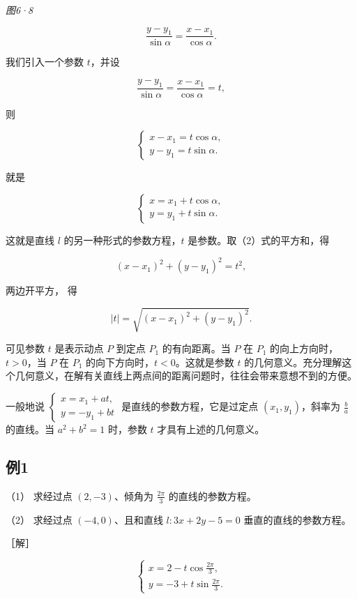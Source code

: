 \emph{图6·8}

\[
\frac {y - y_{1}}{\sin \alpha} = \frac {x - x_{1}}{\cos \alpha}.
\]

我们引入一个参数 \(t\)，并设

\[
\frac {y - y_{1}}{\sin \alpha} = \frac {x - x_{1}}{\cos \alpha} = t,
\]

则

\[
\left\{ \begin{array}{l} x - x_{1} = t \cos \alpha, \\ y - y_{1} = t \sin \alpha. \end{array} \right. \tag {2}
\]

就是

\[
\left\{ \begin{array}{l} x = x_{1} + t \cos \alpha, \\ y = y_{1} + t \sin \alpha. \end{array} \right.
\]

这就是直线 \(l\) 的另一种形式的参数方程，\(t\)
是参数。取（2）式的平方和，得

\[
(x - x_{1}) ^ {2} + (y - y_{1}) ^ {2} = t^{2},
\]

两边开平方， 得

\[
| t | = \sqrt {(x - x_{1}) ^ {2} + (y - y_{1}) ^ {2}}.
\]

可见参数 \(t\) 是表示动点 \(P\) 到定点 \(P_{1}\) 的有向距离。当 \(P\) 在
\(P_{1}\) 的向上方向时，\(t > 0\)，当 \(P\) 在 \(P_{1}\)
的向下方向时，\(t < 0\)。这就是参数 \(t\)
的几何意义。充分理解这个几何意义，在解有关直线上两点间的距离问题时，往往会带来意想不到的方便。

一般地说
\(\left\{ \begin{array}{l} x = x_{1} + at, \\ y = -y_{1} + bt \end{array} \right.\)
是直线的参数方程，它是过定点 \((x_{1}, y_{1})\)，斜率为 \(\frac{b}{a}\)
的直线。当 \(a^{2} + b^{2} = 1\) 时，参数 \(t\) 才具有上述的几何意义。

\subsection{例1}\label{ux4f8b1-44}

（1） 求经过点 \((2,-3)\)、倾角为 \(\frac{2\pi}{3}\) 的直线的参数方程。

（2） 求经过点 \((-4, 0)\)、且和直线 \(l: 3x + 2y - 5 = 0\)
垂直的直线的参数方程。

［解］

\[
\left\{ \begin{array}{l} x = 2 - t \cos \frac {2 \pi}{3}, \\ y = - 3 + t \sin \frac {2 \pi}{3}. \end{array} \right. \tag {1}
\]

